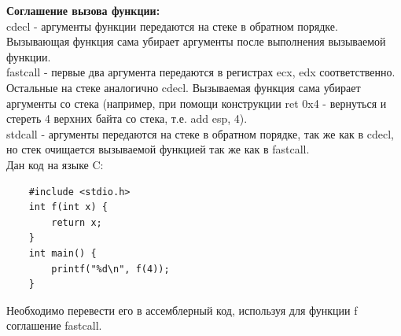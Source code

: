 \documentclass[12pt, letterpaper]{article}
\begin{document}
\noindent\textbf{Соглашение вызова функции:}\\
\indent cdecl - аргументы функции передаются на стеке в обратном порядке. Вызывающая функция сама убирает аргументы после выполнения вызываемой функции.\\
\indent fastcall - первые два аргумента передаются в регистрах ecx, edx соответственно. Остальные на стеке аналогично cdecl. Вызываемая функция сама убирает аргументы со стека (например, при помощи конструкции ret 0x4 - вернуться и стереть 4 верхних байта со стека, т.е. add esp, 4).\\
\indent stdcall - аргументы передаются на стеке в обратном порядке, так же как в cdecl, но стек очищается вызываемой функцией так же как в fastcall.\\

 Дан код на языке C:
 \begin{verbatim}
    #include <stdio.h>
    int f(int x) {
        return x;
    }
    int main() {
        printf("%d\n", f(4));
    }
\end{verbatim}
Необходимо перевести его в ассемблерный код, используя для функции f соглашение fastcall.
\newpage
\end{document}
